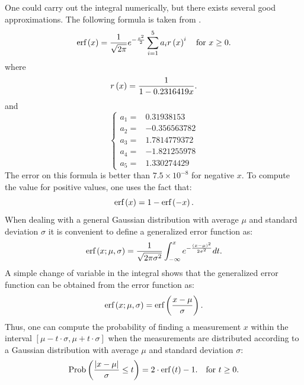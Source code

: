 One could carry out the integral numerically, but there exists
several good approximations. The following formula is taken from
\cite{AbrSteg}.
\begin{equation}
\label{eq:erf} \mathop{\textrm{erf}}\left(x\right)={1 \over \sqrt{2\pi}}e^{-{x^2
\over 2 }}\sum_{i=1}^5 a_i r\left(x\right)^i\mbox{\quad for $x\ge
0$}.
\end{equation}
where
\begin{equation}
\label{eq:erfpol}r\left(x\right)={1 \over {1-0.2316419x}}.
\end{equation}
and
\begin{equation}
\label{eq:erfconst}\left\{ \begin{array}{lr}a_1 =&0.31938153 \\
a_2 =&-0.356563782
\\a_3 =&1.7814779372 \\ a_4 =&-1.821255978 \\ a_5 =&1.330274429
\end{array}\right.
\end{equation}
The error on this formula is better than $7.5\times10^{-8}$ for
negative $x$.
To compute the value for positive values, one uses the fact that:
\begin{equation}
\label{eq:erfneg} \mathop{\textrm{erf}}\left(x\right)=1-\mathop{\textrm{erf}}\left(-x\right).
\end{equation}
When dealing with a general Gaussian distribution with average
$\mu$ and standard deviation $\sigma$ it is convenient to define a
generalized error function as:
\begin{equation}
\mathop{\textrm{erf}}\left(x;\mu,\sigma\right)={1 \over
\sqrt{2\pi\sigma^2}}\int_{-\infty}^x e^{-{{\left(x-\mu\right)}^2
\over 2 \sigma^2}}dt.
\end{equation}
A simple change of variable in the integral shows that the
generalized error function can be obtained from the error function
as:
\begin{equation}
\mathop{\textrm{erf}}\left(x;\mu,\sigma\right)=\mathop{\textrm{erf}}\left({x-\mu\over\sigma}\right).
\end{equation}
Thus, one can compute the probability of finding a measurement $x$
within the interval $\left[\mu - t \cdot \sigma,\mu + t \cdot
\sigma\right] $ when the measurements are distributed according to
a Gaussian distribution with average $\mu$ and standard deviation
$\sigma$:
\begin{equation}
\label{eq:normaccept}
\mathop{\textrm{Prob}}\left({\left|x-\mu\right|\over\sigma}\le t\right)=2 \cdot
\mathop{\textrm{erf}}\left(t\right)-1.\mbox{\quad for $t\ge 0$}.
\end{equation}

